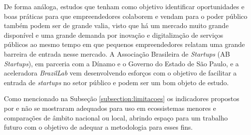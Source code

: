 De forma análoga, estudos que tenham como objetivo identificar oportunidades e boas práticas para que empreendedores colaborem e vendam para o poder público também podem ser de grande valia, visto que há um mercado muito grande disponível e uma grande demanda por inovação e digitalização de serviços públicos ao mesmo tempo em que pequenos empreendedores relatam uma grande barreira de entrada nesse mercado. A Associação Brasileira de \textit{Startups} (AB \textit{Startups}), em parceria com a Dínamo e o Governo do Estado de São Paulo, e a aceleradora \textit{BrazilLab} vem desenvolvendo esforços com o objetivo de facilitar a entrada de \textit{startups} no setor público e podem ser um bom objeto de estudo.

Como mencionado na Subseção \ref{subsection:limitacoes} os indicadores propostos por  e  não se mostraram adequados para uso em ecossistemas menores e comparações de âmbito nacional ou local, abrindo espaço para um trabalho futuro com o objetivo de adequar a metodologia para esses fins.